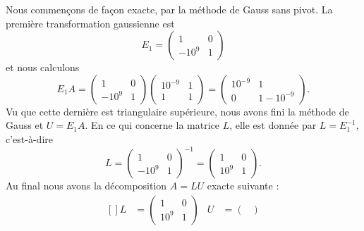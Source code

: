 \begin{example}     \label{ExooNTECooXvTcoh}
    Nous commençons de façon exacte, par la méthode de Gauss sans pivot. La première transformation gaussienne est
    \begin{equation}
        E_1=\begin{pmatrix}
            1    &   0    \\
            -10^9    &   1
        \end{pmatrix}
    \end{equation}
    et nous calculons
    \begin{equation}
        E_1A=\begin{pmatrix}
            1    &   0    \\
            -10^9    &   1
        \end{pmatrix}\begin{pmatrix}
            10^{-9}    &   1    \\
            1    &   1
        \end{pmatrix}=
        \begin{pmatrix}
            10^{-9}    &   1    \\
            0    &   1-10^{-9}
        \end{pmatrix}.
    \end{equation}
    Vu que cette dernière est triangulaire supérieure, nous avons fini la méthode de Gauss et \( U=E_1A\). En ce qui concerne la matrice \( L\), elle est donnée par \( L=E_1^{-1}\), c'est-à-dire
    \begin{equation}
        L=\begin{pmatrix}
            1    &   0    \\
            -10^9    &   1
        \end{pmatrix}^{-1}=
        \begin{pmatrix}
            1    &   0    \\
            10^9    &   1
        \end{pmatrix}.
    \end{equation}
    Au final nous avons la décomposition \( A=LU\) exacte suivante :
    \begin{equation}
        \begin{aligned}[]
            L&=\begin{pmatrix}
                1    &   0    \\
                10^9    &   1
            \end{pmatrix}&U&=\begin{pmatrix}

\end{pmatrix}
\end{aligned}
\end{equation}
\end{example}
